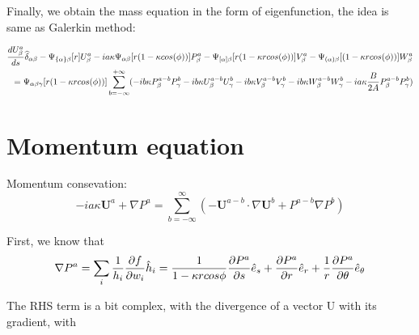 \documentclass{Note}
\begin{document}
Finally, we obtain the mass equation in the form of eigenfunction, the idea is same as Galerkin method:

\begin{equation}
\begin{aligned}
{d U_\beta^a \over d s}\widehat{\delta }_{\alpha\beta}-\Psi_{\{\alpha\}\beta}[r]U_\beta^a-ia \kappa \Psi_{\alpha\beta}[r(1-\kappa cos(\phi))] P_\beta^a -\Psi_{[\alpha]\beta}[ r(1-\kappa r cos(\phi))]V_\beta^a-\Psi_{(\alpha)\beta}[ (1-\kappa r cos(\phi))]W_\beta^a\\
=\Psi_{\alpha\beta\gamma}[r(1-\kappa r cos(\phi))] \sum_{b=-\infty}^{+\infty}(-ib\kappa P_\beta^{a-b} P_\gamma^{b}-ib\kappa U_\beta^{a-b} U_\gamma^{b}-ib\kappa V_\beta^{a-b} V_\gamma^{b}-ib\kappa  W_\beta^{a-b} W_\gamma^{b}-ia\kappa  {B\over {2A}}P_\beta^{a-b}P_\gamma^{b})\\
\end{aligned}
\end{equation}

\section{Momentum equation}


Momentum consevation:
\begin{equation}
-ia\kappa \textbf{U}^a+\nabla P^a=\sum_{b=-\infty}^{\infty}(-\textbf{U}^{a-b}\cdot \nabla \textbf{U}^b+P^{a-b}\nabla P^b)
\end{equation}

First, we know that
\begin{equation}
\begin{aligned}
\nabla P^a=\sum_i{1\over h_i}{\partial f\over {\partial  w_i}}\hat{h}_i={1\over {1-\kappa rcos\phi}}{\partial P^a\over {\partial s}}\hat{e}_s+{\partial P^a\over {\partial r}}\hat{e}_r+{1\over r}{\partial P^a\over {\partial \theta}}\hat{e}_\theta
\end{aligned}
\end{equation}

The RHS term is a bit complex, with the divergence of a vector U with its gradient, with
\end{document}
